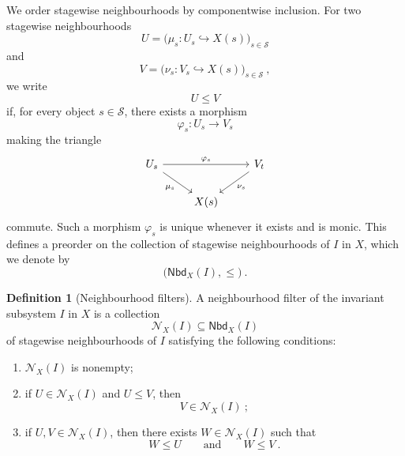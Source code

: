 \documentclass[a4paper,reqno,oneside]{amsart}
\theoremstyle{definition}
\newtheorem{definition}[theorem]{Definition}
\theoremstyle{remark}
\renewcommand{\phi}{\varphi}
\numberwithin{equation}{section}
\begin{document}
	We order stagewise neighbourhoods by componentwise inclusion. For two stagewise neighbourhoods
	\begin{equation}
		U=\big(\mu_s\colon U_s\hookrightarrow X(s)\big)_{s\in\mathcal S}
	\end{equation}
	and
	\begin{equation}
		V=\big(\nu_s\colon V_s\hookrightarrow X(s)\big)_{s\in\mathcal S} \ ,
	\end{equation}
	we write
	\begin{equation}\label{eq: preorder on Nbd}
		U\leq V
	\end{equation}
	if, for every object $s\in\mathcal S$, there exists a morphism
	\begin{equation}
		\phi_s\colon U_s\longrightarrow V_s
	\end{equation}
	making the triangle
	\begin{equation}
		\begin{tikzcd}
			U_s \arrow[rr,"\phi_s"] \arrow[dr,"\mu_s"'] && V_t \arrow[dl,"\nu_s"] \\
			& X(s) &
		\end{tikzcd}
	\end{equation}
	commute. Such a morphism $\phi_s$ is unique whenever it exists
	and is monic. This defines a preorder on the collection of stagewise
	neighbourhoods of $I$ in $X$, which we denote by
	\begin{equation}
		\big(\mathsf{Nbd}_X(I), \leq \big) \ .
	\end{equation}
	
	
	\begin{definition}[Neighbourhood filters]
		A neighbourhood filter of the invariant subsystem $I$ in $X$ is a collection
		\begin{equation}
			\mathcal N_X(I)\subseteq \mathsf{Nbd}_X(I)
		\end{equation}
		of stagewise neighbourhoods of $I$ satisfying the following conditions:
		
		\begin{enumerate}
			\item $\mathcal N_X(I)$ is nonempty;
			
			\item if $U\in\mathcal N_X(I)$ and $U\leq V$, then
			\begin{equation}
				V\in\mathcal N_X(I) \ ;
			\end{equation}
			
			\item if $U,V\in\mathcal N_X(I)$, then there exists
			$W\in\mathcal N_X(I)$ such that
			\begin{equation}
				W\leq U
				\qquad
				\text{and}
				\qquad
				W\leq V \ .
			\end{equation}
		\end{enumerate}
	\end{definition}
	
\end{document}

